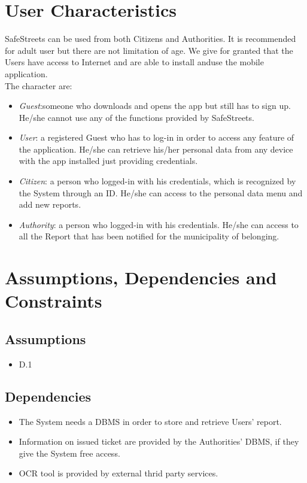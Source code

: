 \documentclass{report}
\begin{document}
\section{User Characteristics}
SafeStreets can be used from both Citizens and Authorities. It is recommended for adult user but there are not limitation of age. 
We give for granted that the Users have access to Internet and are able to install anduse the mobile application.\\
The character are:
\begin{itemize}
	\item \textit{Guest}:someone who downloads and opens the app but still has to sign
	up. He/she cannot use any of the functions provided by SafeStreets.
	\item \textit{User}: a registered Guest who has to log-in in order to access any feature of the application. He/she can retrieve his/her personal data from any
	device with the app installed just providing credentials.
	\item \textit{Citizen}: a person who logged-in with his credentials, which is recognized by the System through an ID. He/she can access to the personal data menu and add new reports.
	\item \textit{Authority}: a person who logged-in with his credentials. He/she can access to all the Report that has been notified for the municipality of belonging.
\end{itemize}

\section{Assumptions, Dependencies and Constraints}
\subsection{Assumptions}
\begin{itemize}
	\item {D.1} %
\end{itemize}
\subsection{Dependencies}
\begin{itemize}
	\item The System needs a DBMS in order to store and retrieve Users’ report.
	\item Information on issued ticket are provided by the Authorities' DBMS, if they give the System free access.
	\item OCR tool is provided by external thrid party services.
\end{itemize}
\end{document}
